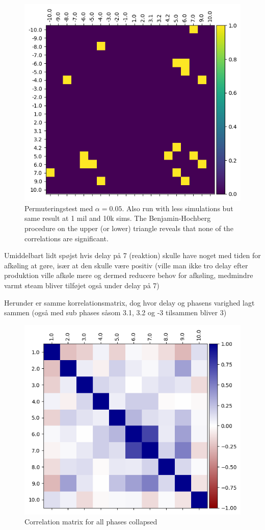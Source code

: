 \documentclass[../Thesis.tex]{subfiles}
\begin{document}
\begin{figure}
    \centering
    \includegraphics[width=.9\linewidth]{figures/Multiple cycles data/Permutation test rho 10 mil.png}
    \caption{Permuteringstest med $\alpha = 0.05$. Also run with less simulations but same result at 1 mil and 10k sims. The Benjamin-Hochberg procedure on the upper (or lower) triangle reveals that none of the correlations are significant.}
\end{figure}

Umiddelbart lidt spøjst hvis delay på 7 (reaktion) skulle have noget med tiden for afkøling at gøre, især at den skulle være positiv (ville man ikke tro delay efter produktion ville afkøle mere og dermed reducere behov for afkøling, medmindre varmt steam bliver tilføjet også under delay på 7)




Herunder er samme korrelationsmatrix, dog hvor delay og phasens varighed lagt sammen (også med sub phases såsom 3.1, 3.2 og -3 tilsammen bliver 3)

\begin{figure}[H]
    \centering
    \includegraphics[width=.7\linewidth]{figures/Multiple cycles data/Correlation matrix collapsed phases.png}
    \caption{Correlation matrix for all phases collapsed}
\end{figure}
\end{document}
